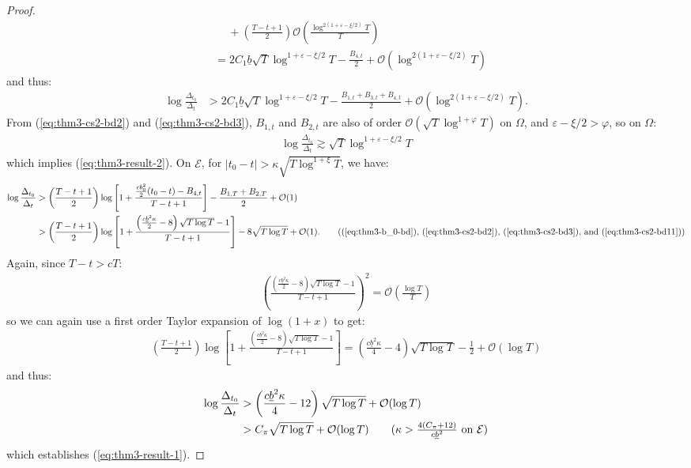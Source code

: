\begin{proof}
\begin{align*}
     &\quad\:+ \left(\frac{T - t +1}{2}\right)\mathcal{O}\left(\frac{\log^{2(1+\varepsilon-\xi/2)}T}{T}\right) \\
     &= 2C_1\underline{b}\sqrt{T}\log^{1+\varepsilon-\xi/2} T- \frac{B_{4,t}}{2} + \mathcal{O}\left(\log^{2(1+\varepsilon-\xi/2)}T\right)
\end{align*}
and thus:
\begin{align*}
    \log \frac{\Delta_{t_0}}{\Delta_t} &> 2C_1\underline{b}\sqrt{T}\log^{1+\varepsilon-\xi/2} T- \frac{B_{1,t} + B_{3,t} + B_{4,t}}{2} + \mathcal{O}\left(\log^{2(1+\varepsilon-\xi/2)}T\right).
\end{align*}
From (\ref{eq:thm3-cs2-bd2}) and (\ref{eq:thm3-cs2-bd3}), $B_{1,t}$ and $B_{2,t}$ are also of order $\mathcal{O}(\sqrt{T}\log^{1+\varphi} T)$ on $\Omega$, and $\varepsilon - \xi /2 > \varphi$, so on $\Omega$: 
\begin{align*}
    \log \frac{\Delta_{t_0}}{\Delta_t} \gtrsim \sqrt{T}\log^{1+\varepsilon-\xi/2} T
\end{align*}
which implies (\ref{eq:thm3-result-2}). On $\mathcal{E}$, for  $|t_0 - t| > \kappa \sqrt{T\log^{1+\xi} T}$, we have:
\begin{align*}
    \log \frac{\Delta_{t_0}}{\Delta_t} &> \left(\frac{T - t +1}{2}\right)\log\left[1  + \frac{\frac{cb_0^2}{2}(t_0 - t)- B_{4,t}}{T-t+1} \right] - \frac{B_{1,T} + B_{2,T}}{2} +  \mathcal{O}(1) \\
    &> \left(\frac{T - t +1}{2}\right)\log\left[1  + \frac{\left(\frac{c\underline{b}^2\kappa}{2} - 8\right)\sqrt{T\log T} - 1}{T-t+1} \right] - 8 \sqrt{T\log T} +  \mathcal{O}(1). \tag{(\ref{eq:thm3-b_0-bd}), (\ref{eq:thm3-cs2-bd2}), (\ref{eq:thm3-cs2-bd3}), and (\ref{eq:thm3-cs2-bd11})}
\end{align*}
Again, since $T-t > cT$: 
\begin{align*}
    \left(\frac{\left(\frac{c\underline{b}^2\kappa}{2} - 8\right)\sqrt{T\log T} - 1}{T-t+1}\right)^2 = \mathcal{O}\left(\frac{\log T}{T}\right)
\end{align*}
so we can again use a first order Taylor expansion of $\log(1+x)$ to get:
\begin{align*}
    \left(\frac{T - t +1}{2}\right)\log\left[1  + \frac{\left(\frac{c\underline{b}^2\kappa}{2} - 8\right)\sqrt{T\log T} - 1}{T-t+1} \right] = \left(\frac{c\underline{b}^2\kappa}{4} - 4\right)\sqrt{T\log T} - \frac{1}{2} + \mathcal{O}(\log T)
\end{align*}
and thus:
\begin{align*}
    \log \frac{\Delta_{t_0}}{\Delta_t} &> \left(\frac{c\underline{b}^2\kappa}{4} - 12\right)\sqrt{T\log T}+ \mathcal{O}(\log T) \\
    &> C_\pi \sqrt{T\log T} + \mathcal{O}(\log T) \tag{$\kappa > \frac{4(C_\pi + 12)}{c\underline{b}^2}$ on $\mathcal{E}$} 
\end{align*}
which establishes (\ref{eq:thm3-result-1}).
\end{proof}